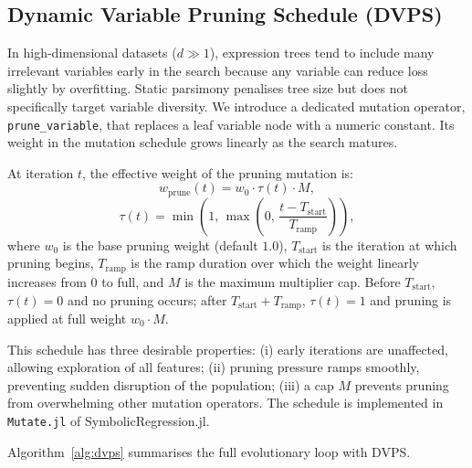\documentclass[10pt,twocolumn]{article}
\begin{document}
\subsection{Dynamic Variable Pruning Schedule (DVPS)}
\label{sec:dvps}

In high-dimensional datasets ($d \gg 1$), expression trees tend to include
many irrelevant variables early in the search because any variable can reduce
loss slightly by overfitting.  Static parsimony penalises tree size but does
not specifically target variable diversity.  We introduce a dedicated mutation
operator, \texttt{prune\_variable}, that replaces a leaf variable node with a
numeric constant.  Its weight in the mutation schedule grows linearly as the
search matures.

At iteration $t$, the effective weight of the pruning mutation is:
\begin{equation}
  w_{\mathrm{prune}}(t) = w_0 \cdot \tau(t) \cdot M,
  \label{eq:prune_schedule}
\end{equation}
\begin{equation}
  \tau(t) = \min\!\left(1,\, \max\!\left(0,\,
            \frac{t - T_{\mathrm{start}}}{T_{\mathrm{ramp}}}\right)\right),
\end{equation}
where $w_0$ is the base pruning weight (default $1.0$), $T_{\mathrm{start}}$
is the iteration at which pruning begins, $T_{\mathrm{ramp}}$ is the ramp
duration over which the weight linearly increases from $0$ to full, and $M$ is
the maximum multiplier cap.  Before $T_{\mathrm{start}}$, $\tau(t) = 0$ and
no pruning occurs; after $T_{\mathrm{start}} + T_{\mathrm{ramp}}$, $\tau(t)
= 1$ and pruning is applied at full weight $w_0 \cdot M$.

This schedule has three desirable properties: (i) early iterations are
unaffected, allowing exploration of all features; (ii) pruning pressure ramps
smoothly, preventing sudden disruption of the population; (iii) a cap $M$
prevents pruning from overwhelming other mutation operators.  The schedule is
implemented in \texttt{Mutate.jl} of SymbolicRegression.jl.

Algorithm~\ref{alg:dvps} summarises the full evolutionary loop with DVPS.
\end{document}
